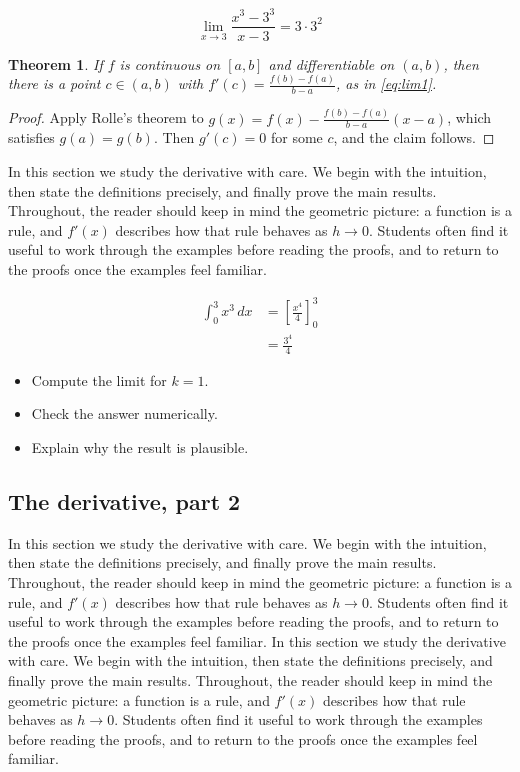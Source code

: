 \documentclass[11pt]{article}
\newtheorem{theorem}{Theorem}[section]
\begin{document}
\begin{equation}
  \lim_{x \to 3} \frac{x^{3} - 3^{3}}{x - 3} = 3 \cdot 3^{2}
  \label{eq:lim1}
\end{equation}

\begin{theorem}
If $f$ is continuous on $[a,b]$ and differentiable on $(a,b)$, then there is a point $c \in (a,b)$ with $f'(c) = \frac{f(b)-f(a)}{b-a}$, as in \eqref{eq:lim1}.
\end{theorem}

\begin{proof}
Apply Rolle's theorem to $g(x) = f(x) - \frac{f(b)-f(a)}{b-a}(x-a)$, which satisfies $g(a) = g(b)$. Then $g'(c) = 0$ for some $c$, and the claim follows.
\end{proof}

In this section we study the derivative with care. We begin with the intuition, then state the definitions precisely, and finally prove the main results. Throughout, the reader should keep in mind the geometric picture: a function is a rule, and $f'(x)$ describes how that rule behaves as $h \to 0$. Students often find it useful to work through the examples before reading the proofs, and to return to the proofs once the examples feel familiar. 

\begin{align}
  \int_0^{3} x^{3}\,dx &= \left[ \frac{x^{4}}{4} \right]_0^{3} \\
  &= \frac{3^{4}}{4} \label{eq:int1}
\end{align}

\begin{itemize}
  \item Compute the limit for $k = 1$.
  \item Check the answer numerically.
  \item Explain why the result is plausible.
\end{itemize}

\subsection{The derivative, part 2}

In this section we study the derivative with care. We begin with the intuition, then state the definitions precisely, and finally prove the main results. Throughout, the reader should keep in mind the geometric picture: a function is a rule, and $f'(x)$ describes how that rule behaves as $h \to 0$. Students often find it useful to work through the examples before reading the proofs, and to return to the proofs once the examples feel familiar. In this section we study the derivative with care. We begin with the intuition, then state the definitions precisely, and finally prove the main results. Throughout, the reader should keep in mind the geometric picture: a function is a rule, and $f'(x)$ describes how that rule behaves as $h \to 0$. Students often find it useful to work through the examples before reading the proofs, and to return to the proofs once the examples feel familiar. 
\end{document}
